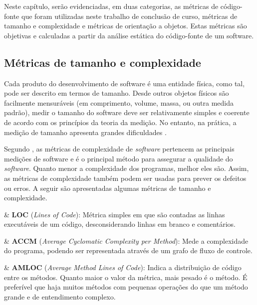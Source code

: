 Neste capítulo, serão evidenciadas, em duas categorias, as métricas de código-fonte que foram utilizadas neste trabalho de conclusão de curso, métricas de tamanho e complexidade e métricas de orientação a objetos. Estas métricas são objetivas e calculadas a partir da análise estática do código-fonte de um software. 

\subsection{Métricas de tamanho e complexidade}

Cada produto do desenvolvimento de software é uma entidade física, como tal, pode ser descrito em termos de tamanho. Desde outros objetos físicos são facilmente mensuráveis (em comprimento, volume, massa, ou outra medida padrão), medir o tamanho do software deve ser relativamente simples e coerente de acordo com os princípios da teoria da medição. No entanto, na prática, a medição de tamanho apresenta grandes dificuldades \cite{Fenton98}. 

Segundo , as métricas de complexidade de  \textit{software} pertencem as principais medições de software e é o principal método para assegurar a qualidade do \textit{software}. Quanto menor a complexidade dos programas, melhor eles são. Assim, as métricas de complexidade também podem ser usadas para prever os defeitos ou erros. A seguir são apresentadas algumas métricas de tamanho e complexidade.

\begin{easylist}[itemize]

	& \textbf{LOC} (\textit{Lines of Code}): Métrica simples em que são contadas as linhas executáveis de um código, desconsiderando linhas em branco e comentários.  \cite{metricsandmodels} 
		
	& \textbf{ACCM} (\textit{Average Cyclomatic Complexity per Method}): Mede a complexidade do programa, podendo ser representada através de um grafo de fluxo de controle. \cite{McCabe76}

	& \textbf{AMLOC} (\textit{Average Method Lines of Code}): Indica a distribuição de código entre os métodos. Quanto maior o valor da métrica, mais pesado é o método. É preferível que haja muitos métodos com pequenas operações do que um método grande e de entendimento complexo. \cite{Meirelles2013}
	
\end{easylist}

